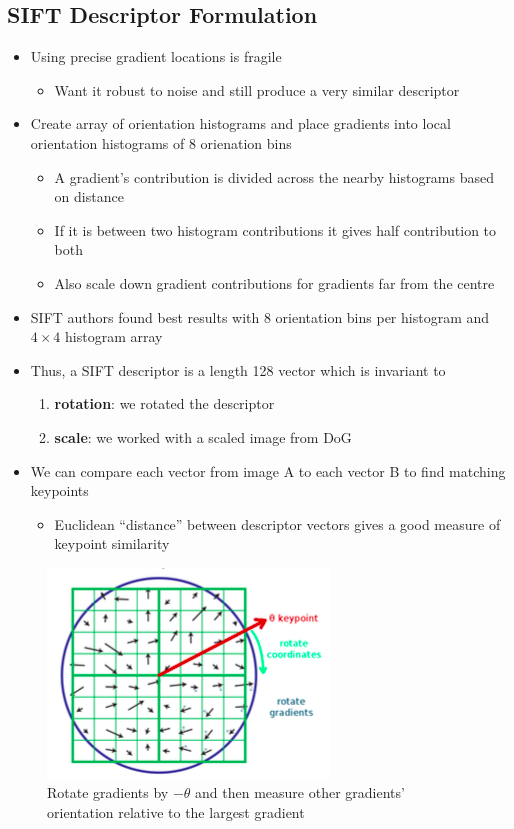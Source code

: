\documentclass[letterpaper,12pt]{article}
\begin{document}
\subsection{SIFT Descriptor Formulation}
\begin{itemize}
 \item Using precise gradient locations is fragile
       \begin{itemize}
        \item Want it robust to noise and still produce a very similar descriptor
       \end{itemize}
 \item Create array of orientation histograms and place gradients into local orientation histograms of 8 orienation bins
       \begin{itemize}
        \item A gradient's contribution is divided across the nearby histograms based on distance
        \item If it is between two histogram contributions it gives half contribution to both
        \item Also scale down gradient contributions for gradients far from the centre
       \end{itemize}
 \item SIFT authors found best results with 8 orientation bins per histogram and $4 \times 4$ histogram array
 \item Thus, a SIFT descriptor is a length 128 vector which is invariant to
       \begin{enumerate}
        \item \textbf{rotation}: we rotated the descriptor
        \item \textbf{scale}: we worked with a scaled image from DoG
       \end{enumerate}
 \item We can compare each vector from image A to each vector B to find matching keypoints
       \begin{itemize}
        \item Euclidean ``distance'' between descriptor vectors gives a good measure of keypoint similarity
       \end{itemize}
\end{itemize}
\begin{figure}
 \centering
 \includegraphics[scale=0.75]{images/gradient_rotation.png}
 \caption{Rotate gradients by $-\theta$ and then measure other gradients' orientation relative to the largest gradient}
\end{figure}
\end{document}
